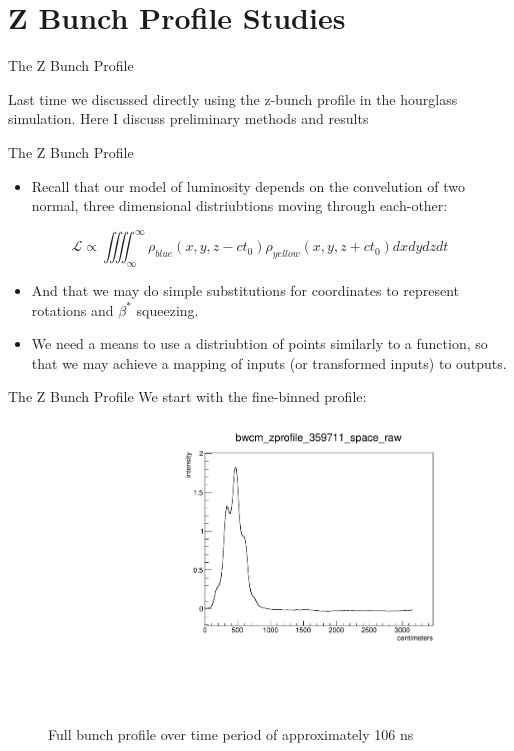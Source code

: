 \section{Z Bunch Profile Studies}
\label{ch:ZBunchProfileStudies}

\begin{frame}{The Z Bunch Profile}

Last time we discussed directly using the z-bunch profile in the hourglass
simulation. Here I discuss preliminary methods and results

\end{frame}

\begin{frame} {The Z Bunch Profile}
\begin{itemize}
\item Recall that our model of luminosity depends on the convelution of two normal,
three dimensional distriubtions moving through each-other:
\end{itemize}
\begin{equation}
\label{eq:generalluminosity}
\mathcal{L} \propto \iiiint _{\infty}^{ \infty}{
\rho_{blue} (x,y,z-ct_0)\rho_{yellow} (x,y,z+ct_0)} dxdydzdt
\end{equation}
\begin{itemize}
\item And that we may do simple substitutions for coordinates to represent rotations
and $\beta^{*}$ squeezing.

\item We need a means to use a distriubtion of points similarly to a function, so that
we may achieve a mapping of inputs (or transformed inputs) to outputs.
\end{itemize}
\end{frame}

\begin{frame}{The Z Bunch Profile}
We start with the fine-binned profile:
\begin{figure}
\begin{center}
\includegraphics[width=0.6\linewidth]{../ZBunchProfileStudies/figs/bwcm_zprofile_359711_space_raw.pdf}
\end{center}
\caption{Full bunch profile over time period of approximately 106 ns}
\label{fig:bwcm_zprofile_359711_space_raw}
\end{figure}
\end{frame}


